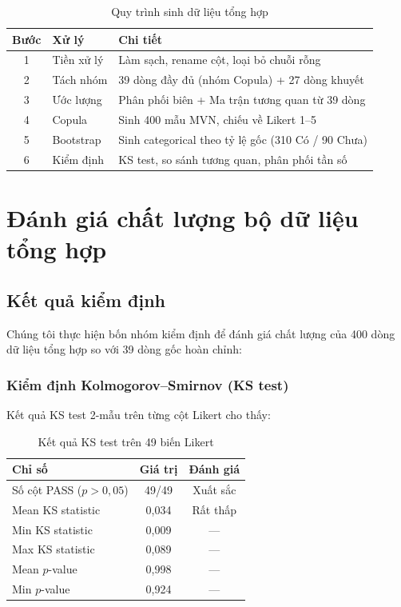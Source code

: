 \documentclass[12pt,a4paper]{article}
\begin{document}
\begin{table}[H]
\centering
\caption{Quy trình sinh dữ liệu tổng hợp}
\label{tab:pipeline}
\begin{tabular}{cll}
\toprule
Bước & Xử lý & Chi tiết \\
\midrule
1 & Tiền xử lý & Làm sạch, rename cột, loại bỏ chuỗi rỗng \\
2 & Tách nhóm & 39 dòng đầy đủ (nhóm Copula) + 27 dòng khuyết \\
3 & Ước lượng & Phân phối biên + Ma trận tương quan từ 39 dòng \\
4 & Copula & Sinh 400 mẫu MVN, chiếu về Likert 1--5 \\
5 & Bootstrap & Sinh categorical theo tỷ lệ gốc (310 Có / 90 Chưa) \\
6 & Kiểm định & KS test, so sánh tương quan, phân phối tần số \\
\bottomrule
\end{tabular}
\end{table}

\newpage
\section{Đánh giá chất lượng bộ dữ liệu tổng hợp}

\subsection{Kết quả kiểm định}

Chúng tôi thực hiện bốn nhóm kiểm định để đánh giá chất lượng 
của 400 dòng dữ liệu tổng hợp so với 39 dòng gốc hoàn chỉnh:

\subsubsection{Kiểm định Kolmogorov--Smirnov (KS test)}

Kết quả KS test 2-mẫu trên từng cột Likert cho thấy:

\begin{table}[H]
\centering
\caption{Kết quả KS test trên 49 biến Likert}
\label{tab:kstest}
\begin{tabular}{lcc}
\toprule
Chỉ số & Giá trị & Đánh giá \\
\midrule
Số cột PASS ($p > 0{,}05$) & 49/49 & Xuất sắc \\
Mean KS statistic & 0,034 & Rất thấp \\
Min KS statistic & 0,009 & --- \\
Max KS statistic & 0,089 & --- \\
Mean $p$-value & 0,998 & --- \\
Min $p$-value & 0,924 & --- \\
\bottomrule
\end{tabular}
\end{table}
\end{document}
